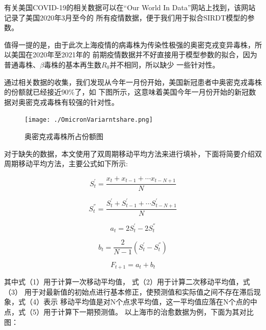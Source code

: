 \documentclass[bwprint]{gmcmthesis}
\numberwithin{figure}{section}
\begin{document}
\par 有关美国COVID-19的相关数据可以在“Our World In Data”网站上找到，该网站记录了美国2020年3月至今的
所有疫情数据，便于我们用于拟合SIRDT模型的参数。

\par 值得一提的是，由于此次上海疫情的病毒株为传染性极强的奥密克戎变异毒株，所以美国在2020年至2021年的
前期疫情数据并不好直接用于模型参数的拟合，因为普通毒株、$\beta$毒株的基本再生数$R_0$并不相同，所以缺少
一些针对性。

\par 通过相关数据的收集，我们发现从今年一月份开始，美国新冠患者中奥密克戎毒株的份额就已经接近90$\%$了，如
下图所示，这意味着美国今年一月份开始的新冠数据对奥密克戎毒株有较强的针对性。

\begin{figure}[!h]
    \centering
    \texttt{[image: ./OmicronVariarntshare.png]}
    \caption{奥密克戎毒株所占份额图}
    \label{fig1}
\end{figure}

\par 对于缺失的数据，本文使用了双周期移动平均方法来进行填补，下面将简要介绍双周期移动平均方法，主要公式如下所示:

\begin{equation}
    S_{t}^{'}=\dfrac{x_t+x_{t-1}+\cdots x_{t-N+1}}{N}
\end{equation}

\begin{equation}
    S_{t}^{''}=\dfrac{S_{t}^{'}+S_{t-1}^{'}+\cdots S_{t-N+1}^{'}}{N}
\end{equation}

\begin{equation}
    a_t=2S_{t}^{'}-2S_{t}^{''}
\end{equation}

\begin{equation}
    b_t=\dfrac{2}{N-1}\left( S_{t}^{'}-S_{t}^{''} \right) 
\end{equation}

\begin{equation}
    F_{t+1}=a_t+b_t
\end{equation}

\par 其中式（1）用于计算一次移动平均值， 式（2）用于计算二次移动平均值，式（3）
用于对最新值的初始点进行基本修正，使预测值和实际值之间不存在滞后现象，式（4）表示
移动平均值是对N个点求平均值，这一平均值应落在N个点的中点，式（5）用于计算下一期预测值。
以上海市的治愈数据为例，下面为其对比图：
\end{document}
